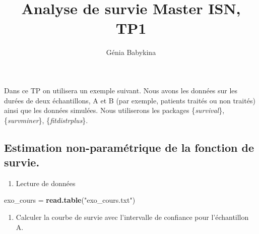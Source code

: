 \documentclass[
]{article}
\title{Analyse de survie Master ISN, TP1}
\author{Génia Babykina}
\date{}
\newenvironment{Shaded}{\begin{snugshade}}{\end{snugshade}}
\newcommand{\KeywordTok}[1]{\textcolor[rgb]{0.13,0.29,0.53}{\textbf{#1}}}
\newcommand{\NormalTok}[1]{#1}
\newcommand{\StringTok}[1]{\textcolor[rgb]{0.31,0.60,0.02}{#1}}
\providecommand{\tightlist}{%
  \setlength{\itemsep}{0pt}\setlength{\parskip}{0pt}}
\begin{document}
\maketitle

Dans ce TP on utilisera un exemple suivant. Nous avons les données sur
les durées de deux échantillons, A et B (par exemple, patients traités
ou non traités) ainsi que les données simulées. Nous utiliserons les
packages \{\textit{survival}\}, \{\textit{survminer}\},
\{\textit{fitdistrplus}\}.

\hypertarget{estimation-non-paramuxe9trique-de-la-fonction-de-survie.}{%
\subsection{Estimation non-paramétrique de la fonction de
survie.}\label{estimation-non-paramuxe9trique-de-la-fonction-de-survie.}}

\begin{enumerate}
\def\labelenumi{\arabic{enumi})}
\tightlist
\item
  Lecture de données
\end{enumerate}

\begin{Shaded}
\begin{Highlighting}[]
\NormalTok{exo_cours =}\StringTok{ }\KeywordTok{read.table}\NormalTok{(}\StringTok{"exo_cours.txt"}\NormalTok{)}
\end{Highlighting}
\end{Shaded}

\begin{enumerate}
\def\labelenumi{\arabic{enumi})}
\setcounter{enumi}{1}
\tightlist
\item
  Calculer la courbe de survie avec l'intervalle de confiance pour
  l'échantillon A.
\end{enumerate}
\end{document}

